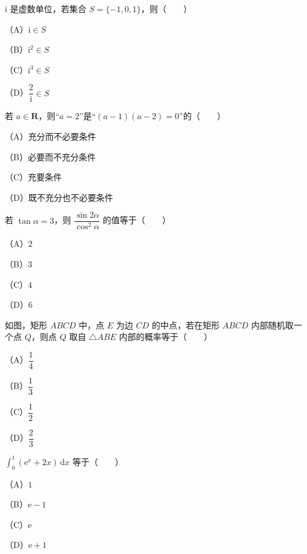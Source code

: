 

\begin{question}
$\mathrm i$ 是虚数单位，若集合 $S=\{-1,0,1\}$，则\mbox{（　　）}

（A）$\mathrm i\in S$

（B）$\mathrm i^2\in S$

（C）$\mathrm i^3\in S$

（D）$\dfrac2{\mathrm i}\in S$

\end{question}
\begin{question}
若 $a\in\mathbf R$，则“$a=2$”是“$(a-1)(a-2)=0$”的\mbox{（　　）}

（A）充分而不必要条件

（B）必要而不充分条件

（C）充要条件

（D）既不充分也不必要条件

\end{question}
\begin{question}
若 $\tan\alpha=3$，则 $\dfrac{\sin2\alpha}{\cos^2\alpha}$ 的值等于\mbox{（　　）}

（A）$2$

（B）$3$

（C）$4$

（D）$6$

\Needspace{0.4\textheight}
\end{question}
\begin{question}
如图，矩形 $ABCD$ 中，点 $E$ 为边 $CD$ 的中点，若在矩形 $ABCD$ 内部随机取一个点 $Q$，则点 $Q$ 取自 $\triangle ABE$ 内部的概率等于\mbox{（　　）}

（A）$\dfrac14$

（B）$\dfrac13$

（C）$\dfrac12$

（D）$\dfrac23$
\nopagebreak[4]
\begin{center}\end{center}
\nopagebreak[4]
\end{question}
\begin{question}
$\displaystyle\int_0^1(\mathrm e^x+2x)\,\mathrm dx$ 等于\mbox{（　　）}

（A）$1$

（B）$\mathrm e-1$

（C）$\mathrm e$

（D）$\mathrm e+1$

\end{question}
